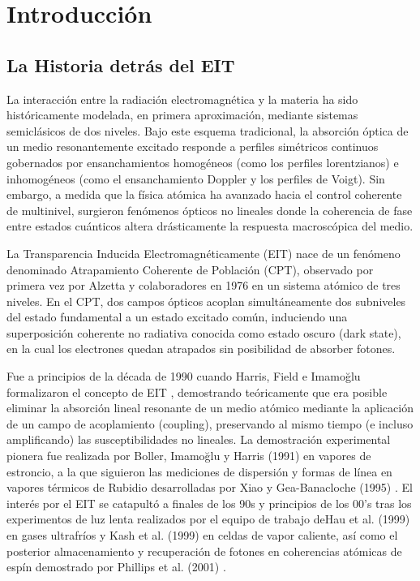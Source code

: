 \section{Introducción}
\subsection{La Historia detrás del EIT}
La interacción entre la radiación electromagnética y la materia ha sido históricamente modelada, en primera aproximación, mediante sistemas semiclásicos de dos niveles. Bajo este esquema tradicional, la absorción óptica de un medio resonantemente excitado responde a perfiles simétricos continuos gobernados por ensanchamientos homogéneos (como los perfiles lorentzianos) e inhomogéneos (como el ensanchamiento Doppler y los perfiles de Voigt). Sin embargo, a medida que la física atómica ha avanzado hacia el control coherente de multinivel, surgieron fenómenos ópticos no lineales donde la coherencia de fase entre estados cuánticos altera drásticamente la respuesta macroscópica del medio.

La Transparencia Inducida Electromagnéticamente (EIT) nace de un fenómeno denominado Atrapamiento Coherente de Población (CPT), observado por primera vez por Alzetta y colaboradores en 1976 \cite{alzettaExperimentalMethodObservation1976} en un sistema atómico de tres niveles. En el CPT, dos campos ópticos acoplan simultáneamente dos subniveles del estado fundamental a un estado excitado común, induciendo una superposición coherente no radiativa conocida como estado oscuro (dark state), en la cual los electrones quedan atrapados sin posibilidad de absorber fotones.

Fue a principios de la década de 1990 cuando Harris, Field e Imamoğlu formalizaron el concepto de EIT \cite{harrisNonlinearOpticalProcesses1990}, demostrando teóricamente que era posible eliminar la absorción lineal resonante de un medio atómico mediante la aplicación de un campo de acoplamiento (coupling), preservando al mismo tiempo (e incluso amplificando) las susceptibilidades no lineales. La demostración experimental pionera fue realizada por Boller, Imamoğlu y Harris (1991) en vapores de estroncio, a la que siguieron las mediciones de dispersión y formas de línea en vapores térmicos de Rubidio desarrolladas por Xiao y Gea-Banacloche (1995) \cite{xiaoMeasurementDispersiveProperties1995}. El interés por el EIT se catapultó a finales de los 90s y principios de los 00's tras los experimentos de luz lenta realizados por el equipo de trabajo deHau et al. (1999) \cite{hauLightSpeedReduction1999} en gases ultrafríos y Kash et al. (1999) en celdas de vapor caliente, así como el posterior almacenamiento y recuperación de fotones en coherencias atómicas de espín demostrado por Phillips et al. (2001) \cite{phillipsStorageLightAtomic2001}.

